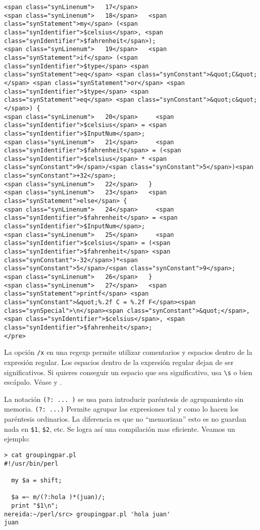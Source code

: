 \begin{verbatim}
<span class="synLinenum">   17</span> 
<span class="synLinenum">   18</span>   <span class="synStatement">my</span> (<span class="synIdentifier">$celsius</span>, <span class="synIdentifier">$fahrenheit</span>);
<span class="synLinenum">   19</span>   <span class="synStatement">if</span> (<span class="synIdentifier">$type</span> <span class="synStatement">eq</span> <span class="synConstant">&quot;C&quot;</span> <span class="synStatement">or</span> <span class="synIdentifier">$type</span> <span class="synStatement">eq</span> <span class="synConstant">&quot;c&quot;</span>) {
<span class="synLinenum">   20</span>     <span class="synIdentifier">$celsius</span> = <span class="synIdentifier">$InputNum</span>;
<span class="synLinenum">   21</span>     <span class="synIdentifier">$fahrenheit</span> = (<span class="synIdentifier">$celsius</span> * <span class="synConstant">9</span>/<span class="synConstant">5</span>)<span class="synConstant">+32</span>;
<span class="synLinenum">   22</span>   }
<span class="synLinenum">   23</span>   <span class="synStatement">else</span> {
<span class="synLinenum">   24</span>     <span class="synIdentifier">$fahrenheit</span> = <span class="synIdentifier">$InputNum</span>;
<span class="synLinenum">   25</span>     <span class="synIdentifier">$celsius</span> = (<span class="synIdentifier">$fahrenheit</span> <span class="synConstant">-32</span>)*<span class="synConstant">5</span>/<span class="synConstant">9</span>;
<span class="synLinenum">   26</span>   }
<span class="synLinenum">   27</span>   <span class="synStatement">printf</span> <span class="synConstant">&quot;%.2f C = %.2f F</span><span class="synSpecial">\n</span><span class="synConstant">&quot;</span>, <span class="synIdentifier">$celsius</span>, <span class="synIdentifier">$fahrenheit</span>;
</pre>

\end{verbatim}


\label{section:x}
La opción \verb|/x| en una regexp permite utilizar comentarios y
espacios dentro de la expresión
regular. Los espacios dentro de la expresión regular dejan de ser significativos.
Si quieres conseguir un espacio que sea significativo, usa \verb|\s| o
bien escápalo.  Véase  y 
.


La notación \verb|(?: ... )| se usa para introducir paréntesis de agrupamiento sin memoria.
\verb|(?: ...)| 
Permite agrupar las expresiones tal y como lo hacen los 
paréntesis ordinarios. La diferencia es que no ``memorizan''
esto es no guardan nada en \verb|$1|, \verb|$2|, etc.
Se logra así una compilación mas eficiente. Veamos un ejemplo:
\begin{verbatim}
> cat groupingpar.pl
#!/usr/bin/perl

  my $a = shift;

  $a =~ m/(?:hola )*(juan)/;
  print "$1\n";
nereida:~/perl/src> groupingpar.pl 'hola juan'
juan
\end{verbatim}

